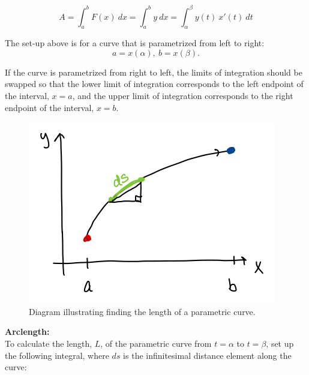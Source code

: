 \[
A = \int_a^b F(x)\ dx  = \int_a^b y\ dx  = \int_\alpha^\beta y(t)\ x'(t)\ dt%
\]

The set-up above is for a curve that is parametrized from left to right: 
\[a = x(\alpha),\ b = x(\beta).\]

If the curve is parametrized from right to left, the limits of integration should be swapped so that the lower limit of integration corresponds to the left endpoint of the interval, \(x=a\), and the upper limit of integration corresponds to the right endpoint of the interval, \(x=b\).




\begin{figure}[!h]

\includegraphics[width=\textwidth]{parametric-arclength.png}
\caption{Diagram illustrating finding the length of a parametric curve.}
\end{figure}

\hspace*{.2in}

\textbf{Arclength:}\\
To calculate the length, \(L\), of the parametric curve from \(t=\alpha\) to \(t = \beta\), set up the following integral, where \(ds\) is the infinitesimal distance element along the curve:

